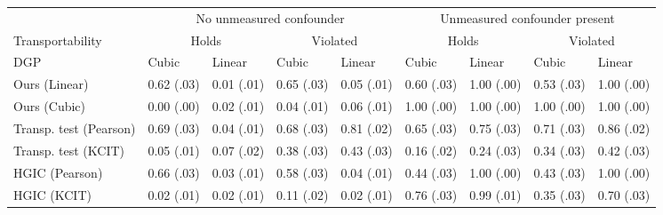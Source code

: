     \begin{tabular}{l|ll|ll|ll|ll}
\toprule
 & \multicolumn{4}{c}{No unmeasured confounder} & \multicolumn{4}{c}{Unmeasured confounder present} \\
Transportability & \multicolumn{2}{c}{Holds} & \multicolumn{2}{c}{Violated} & \multicolumn{2}{c}{Holds} & \multicolumn{2}{c}{Violated} \\
DGP & Cubic & Linear & Cubic & Linear & Cubic & Linear & Cubic & Linear \\
\midrule
Ours (Linear) & 0.62 (.03) & 0.01 (.01) & 0.65 (.03) & 0.05 (.01) & 0.60 (.03) & 1.00 (.00) & 0.53 (.03) & 1.00 (.00) \\
Ours (Cubic) & 0.00 (.00) & 0.02 (.01) & 0.04 (.01) & 0.06 (.01) & 1.00 (.00) & 1.00 (.00) & 1.00 (.00) & 1.00 (.00) \\
Transp. test (Pearson) & 0.69 (.03) & 0.04 (.01) & 0.68 (.03) & 0.81 (.02) & 0.65 (.03) & 0.75 (.03) & 0.71 (.03) & 0.86 (.02) \\
Transp. test (KCIT) & 0.05 (.01) & 0.07 (.02) & 0.38 (.03) & 0.43 (.03) & 0.16 (.02) & 0.24 (.03) & 0.34 (.03) & 0.42 (.03) \\
HGIC (Pearson) & 0.66 (.03) & 0.03 (.01) & 0.58 (.03) & 0.04 (.01) & 0.44 (.03) & 1.00 (.00) & 0.43 (.03) & 1.00 (.00) \\
HGIC (KCIT) & 0.02 (.01) & 0.02 (.01) & 0.11 (.02) & 0.02 (.01) & 0.76 (.03) & 0.99 (.01) & 0.35 (.03) & 0.70 (.03) \\
\bottomrule
\end{tabular}
